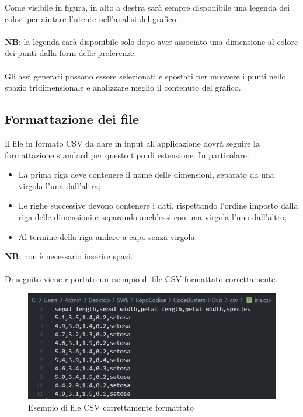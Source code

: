 Come visibile in figura, in alto a destra sarà sempre disponibile una legenda dei colori per aiutare l'utente nell'analisi del grafico.\\\mbox{}\\ \textbf{NB}: la legenda sarà disponibile solo dopo aver associato una dimensione al colore dei punti dalla form delle preferenze.\\
\mbox{}\\
Gli assi generati possono essere selezionati e spostati per muovere i punti nello spazio tridimensionale e analizzare meglio il contenuto del grafico.

\newpage
\subsection{Formattazione dei file}

Il file in formato CSV da dare in input all'applicazione dovrà seguire la formattazione standard per questo tipo di estensione. In particolare:
\begin{itemize}
	\item La prima riga deve contenere il nome delle dimensioni, separato da una virgola l'una dall'altra;
	\item Le righe successive devono contenere i dati, rispettando l'ordine imposto dalla riga delle dimensioni e separando anch'essi con una virgola l'uno dall'altro;
	\item Al termine della riga andare a capo senza virgola.
\end{itemize}

\textbf{NB}: non è necessario inserire spazi.\\ \mbox{}\\

Di seguito viene riportato un esempio di file CSV formattato correttamente.

\begin{figure}[H]
		\includegraphics[scale=0.9]{Images/csv}
		\centering
		\caption{Esempio di file CSV correttamente formattato}
\end{figure}



